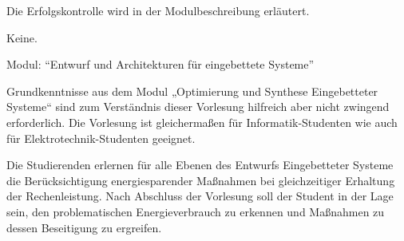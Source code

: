 \begin{course}

\setdoclanguagegerman
{}



\coursehead


\label{cour_6269.dp_997}


\begin{styleenv}
\begin{assessment}
Die Erfolgskontrolle wird in der Modulbeschreibung erläutert.


\end{assessment}

\begin{conditions}Keine.\end{conditions}

\begin{recommendations}Modul: “Entwurf und Architekturen für eingebettete Systeme”

 

Grundkenntnisse aus dem Modul „Optimierung und Synthese Eingebetteter Systeme“ sind zum Verständnis dieser Vorlesung hilfreich aber nicht zwingend erforderlich. Die Vorlesung ist gleichermaßen für Informatik-Studenten wie auch für Elektrotechnik-Studenten geeignet.

\end{recommendations}
\end{styleenv}

\begin{learningoutcomes}
Die Studierenden erlernen für alle Ebenen des Entwurfs Eingebetteter Systeme die Berücksichtigung energiesparender Maßnahmen bei gleichzeitiger Erhaltung der Rechenleistung. Nach Abschluss der Vorlesung soll der Student in der Lage sein, den problematischen Energieverbrauch zu erkennen und Maßnahmen zu dessen Beseitigung zu ergreifen.


\end{learningoutcomes}


\end{course}
